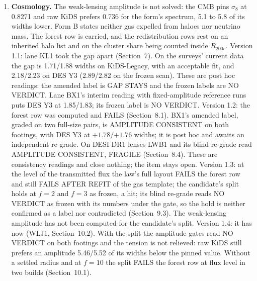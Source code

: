 \documentclass[10pt]{article}
\begin{document}
\begin{enumerate}
\item \textbf{Cosmology.} The weak-lensing amplitude is not solved: the CMB pins $\sigma_8$ at 0.8271 and raw KiDS prefers 0.736 for the form's spectrum, 5.1 to 5.8 of its widths lower. Form B states neither gas expelled from haloes nor neutrino mass. The forest row is carried, and the redistribution rows rest on an inherited halo list and on the cluster share being counted inside $R_{200c}$. Version 1.1: lane KL1 took the gap apart (Section~7). On the surveys' current data the gap is 1.71/1.88 widths on KiDS-Legacy, with an acceptable fit, and 2.18/2.23 on DES Y3 (2.89/2.82 on the frozen scan). These are post hoc readings: the amended label is GAP STAYS and the frozen labels are NO VERDICT. Lane BX1's interim reading with fixed-amplitude reference runs puts DES Y3 at 1.85/1.83; its frozen label is NO VERDICT. Version 1.2: the forest row was computed and FAILS (Section~8.1). BX1's amended label, graded on two full-size pairs, is AMPLITUDE CONSISTENT on both footings, with DES Y3 at $+1.78$/$+1.76$ widths; it is post hoc and awaits an independent re-grade. On DESI DR1 lenses LWB1 and its blind re-grade read AMPLITUDE CONSISTENT, FRAGILE (Section~8.4). These are consistency readings and close nothing; the item stays open. Version 1.3: at the level of the transmitted flux the law's full layout FAILS the forest row and still FAILS AFTER REFIT of the gas template; the candidate's split holds at $f=2$ and $f=3$ as frozen, a hit; its blind re-grade reads NO VERDICT as frozen with its numbers under the gate, so the hold is neither confirmed as a label nor contradicted (Section~9.3). The weak-lensing amplitude has not been computed for the candidate's split. Version 1.4: it has now (WLJ1, Section~10.2). With the split the amplitude gates read NO VERDICT on both footings and the tension is not relieved: raw KiDS still prefers an amplitude 5.46/5.52 of its widths below the pinned value. Without a settled radius and at $f=10$ the split FAILS the forest row at flux level in two builds (Section~10.1).
\end{enumerate}
\end{document}
